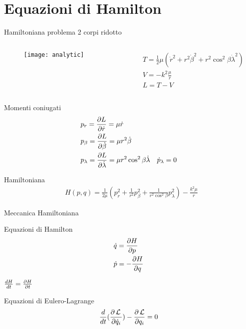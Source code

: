 \section{Equazioni di Hamilton}
\begin{frame}{Hamiltoniana problema 2 corpi ridotto}
\begin{columns}
\begin{column}{0.2\textwidth}
\begin{figure}[!ht]
\texttt{[image: analytic]}
\end{figure}
\end{column}
\begin{column}{0.8\textwidth}
\begin{align*}
&T=\frac{1}{2}\mu(\dot{r}^2+r^2\dot{\beta}^2+r^2\cos^2{\beta}\dot{\lambda}^2)\\
&V=-k^2\frac{\mu}{r}\\
&L=T-V
\end{align*}
\end{column}
\end{columns}
\begin{block}{Momenti coniugati}
\begin{align*}
&p_r=\PDy{\dot{r}}{L}=\mu\dot{r}\\
&p_{\beta}=\PDy{\dot{\beta}}{L}=\mu r^2\dot{\beta}\\
&p_{\lambda}=\PDy{\dot{\lambda}}{L}=\mu r^2\cos^2{\beta}\dot{\lambda}\quad \dot{p}_{\lambda}=0
\end{align*}
\end{block}
\begin{block}{Hamiltoniana}
\begin{align*}
&H(p,q)=\frac{1}{2\mu}(p_r^2+\frac{1}{r^2}p_{\beta}^2+\frac{1}{r^2\cos^2{\beta}}p_{\lambda}^2)-\frac{k^2\mu}{r}
\end{align*}
\end{block}
\end{frame}

\begin{wordonframe}{Meccanica Hamiltoniana}
\begin{block}{Equazioni di Hamilton}
\begin{align*}
&\dot{q}=\PDy{p}{H}\\
&\dot{p}=-\PDy{q}{H}
\end{align*}
\end{block}
$\TDy{t}{H}=\PDy{t}{H}$
\begin{block}{Equazioni di Eulero-Lagrange}
\begin{equation*}
\TDof{t}(\PDy{\dot{q}_i}{\lagrange{}})-\PDy{q_i}{\lagrange}=0
\end{equation*}
\end{block}
\end{wordonframe}

